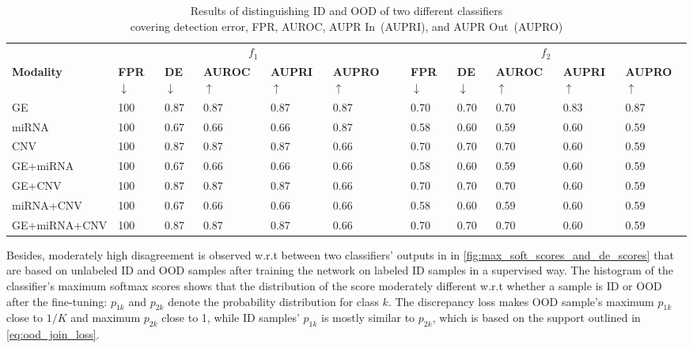 \begin{table}
	\centering
	\caption[Results of distinguishing ID and OOD of different classifiers]{Results of distinguishing ID and OOD of two different classifiers\\ covering detection error, FPR, AUROC, AUPR In~(AUPRI), and AUPR Out~(AUPRO)} 
	\scriptsize{
	\vspace{-4mm}
	\begin{tabular}{llllllllllll}
		&\multicolumn{5}{c}{\bfseries{$f_1$}} && \multicolumn{5}{c}{\bfseries{$f_2$}} \\	
		\cmidrule{2-6}\cmidrule{8-12}   
		\textbf{Modality}&\textbf{FPR$\downarrow$} & \textbf{DE$\downarrow$} & \textbf{AUROC$\uparrow$} & \textbf{AUPRI$\uparrow$} & \textbf{AUPRO$\uparrow$}
		&& \textbf{FPR$\downarrow$} & \textbf{DE$\downarrow$} & \textbf{AUROC$\uparrow$} & \textbf{AUPRI$\uparrow$} & \textbf{AUPRO$\uparrow$}\\
		\hline
		\multirow{1}{*}{{GE}} & 100 & 0.87 & 0.87 & 0.87 & 0.87 && 0.70 & 0.70 & 0.70 & 0.83 & 0.87\\
		\hline
		\multirow{1}{*}{{miRNA}} & 100 & 0.67 & 0.66 & 0.66 & 0.87 && 0.58 & 0.60 & 0.59 & 0.60 & 0.59\\
		\hline
		\multirow{1}{*}{{CNV}} & 100 & 0.87 & 0.87 & 0.87 & 0.66 && 0.70 & 0.70 & 0.70 & 0.60 & 0.59\\
		\hline
		\multirow{1}{*}{{GE+miRNA}} & 100 & 0.67 & 0.66 & 0.66 & 0.66 && 0.58 & 0.60 & 0.59 & 0.60 & 0.59\\
		\hline
		\multirow{1}{*}{{GE+CNV}} & 100 & 0.87 & 0.87 & 0.87 & 0.66 && 0.70 & 0.70 & 0.70 & 0.60 & 0.59\\
		\hline
		\multirow{1}{*}{{miRNA+CNV}} & 100 & 0.67 & 0.66 & 0.66 & 0.66 && 0.58 & 0.60 & 0.59 & 0.60 & 0.59\\
		\hline
		\multirow{1}{*}{{GE+miRNA+CNV}} & 100 & 0.87 & 0.87 & 0.87 & 0.66 && 0.70 & 0.70 & 0.70 & 0.60 & 0.59\\
		\hline
	\end{tabular} }
	\vspace{-2mm}
	\label{Table:OOD_result_2}
\end{table}

\hspace*{3.5mm} Besides, moderately high disagreement is observed w.r.t between two classifiers' outputs in in \cref{fig:max_soft_scores_and_de_scores} that are based on unlabeled ID and OOD samples after training the network on labeled ID samples in a supervised way. The histogram of the classifier's maximum softmax scores shows that the distribution of the score moderately different w.r.t whether a sample is ID or OOD after the fine-tuning: $p_{1k}$ and $p_{2k}$ denote the probability distribution for class $k$. The discrepancy loss makes OOD sample's maximum $p_{1k}$ close to $1/K$ and maximum $p_{2k}$ close to 1, while ID samples' $p_{1k}$ is mostly similar to $p_{2k}$, which is based on the support outlined in \cref{eq:ood_join_loss}.

